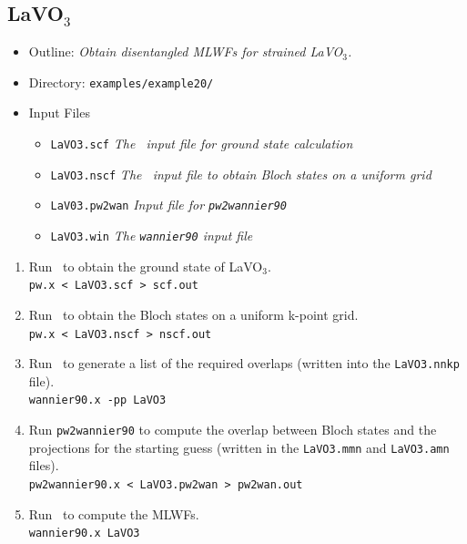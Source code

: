 \documentclass[a4paper,11pt,twoside]{article}
\begin{document}
\subsection*{LaVO$_3$}
\begin{itemize}
\item{Outline: \it{Obtain disentangled MLWFs for strained LaVO$_3$.}}
\item{Directory: {\tt examples/example20/}}
\item{Input Files}
\begin{itemize}
\item{ {\tt LaVO3.scf}  {\it The \pwscf\ input file for ground state
    calculation}} 
\item{ {\tt LaVO3.nscf}  {\it The \pwscf\ input file to obtain Bloch
    states on a uniform grid}} 
\item{ {\tt LaV03.pw2wan}  {\it Input file for {\tt pw2wannier90}}}
\item{ {\tt LaVO3.win}  {\it The {\tt wannier90} input file}}
\end{itemize}

\end{itemize}

\begin{enumerate}
\item Run \pwscf\ to obtain the ground state of LaVO$_3$.\\
{\tt pw.x < LaVO3.scf > scf.out}

\item Run \pwscf\ to obtain the Bloch states on a uniform k-point
  grid.\\ 
{\tt pw.x < LaVO3.nscf > nscf.out}

\item Run \wannier\ to generate a list of the required overlaps (written
  into the {\tt LaVO3.nnkp} file).\\
{\tt wannier90.x -pp LaVO3}

\item Run {\tt pw2wannier90} to compute the overlap between Bloch
  states and the projections for the starting guess (written in the
  {\tt LaVO3.mmn} and {\tt  LaVO3.amn} files).\\
{\tt pw2wannier90.x < LaVO3.pw2wan > pw2wan.out}

\item Run \wannier\ to compute the MLWFs.\\
{\tt wannier90.x LaVO3}

\end{enumerate}
\end{document}
